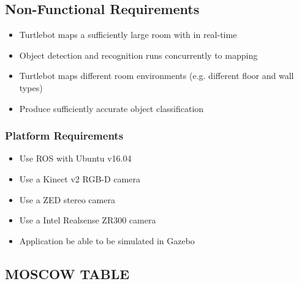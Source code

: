 \documentclass{mproj}
\begin{document}
\subsection{Non-Functional Requirements}
\begin{itemize}
\item Turtlebot maps a sufficiently large room with in real-time
\item Object detection and recognition runs concurrently to mapping
\item Turtlebot maps different room environments (e.g. different floor and wall types)
\item Produce sufficiently accurate object classification
\end{itemize}

\subsubsection{Platform Requirements}
\begin{itemize}
\item Use ROS with Ubuntu v16.04
\item Use a Kinect v2 RGB-D camera
\item Use a ZED stereo camera
\item Use a Intel Realsense ZR300 camera
\item Application be able to be simulated in Gazebo
\end{itemize}

 \subsection{MOSCOW TABLE}
\end{document}
